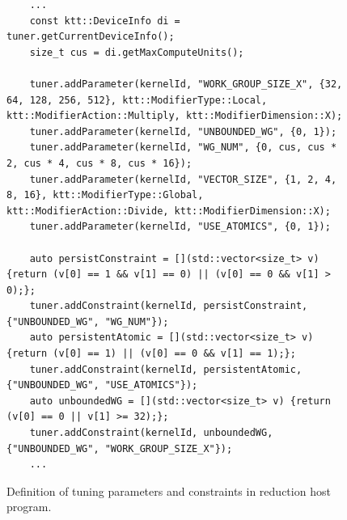 \documentclass
[
    digital, %
    oneside, %
    table, %
    nolof, %
    nolot, %
    nocover %
]{fithesis3}
\begin{document}
\begin{figure}
\footnotesize
\begin{adjustwidth}{-1cm}{-1cm}
\begin{lstlisting}
    ...
    const ktt::DeviceInfo di = tuner.getCurrentDeviceInfo();
    size_t cus = di.getMaxComputeUnits();
    
    tuner.addParameter(kernelId, "WORK_GROUP_SIZE_X", {32, 64, 128, 256, 512}, ktt::ModifierType::Local, ktt::ModifierAction::Multiply, ktt::ModifierDimension::X);
    tuner.addParameter(kernelId, "UNBOUNDED_WG", {0, 1});
    tuner.addParameter(kernelId, "WG_NUM", {0, cus, cus * 2, cus * 4, cus * 8, cus * 16});
    tuner.addParameter(kernelId, "VECTOR_SIZE", {1, 2, 4, 8, 16}, ktt::ModifierType::Global, ktt::ModifierAction::Divide, ktt::ModifierDimension::X);
    tuner.addParameter(kernelId, "USE_ATOMICS", {0, 1});
    
    auto persistConstraint = [](std::vector<size_t> v) {return (v[0] == 1 && v[1] == 0) || (v[0] == 0 && v[1] > 0);};
    tuner.addConstraint(kernelId, persistConstraint, {"UNBOUNDED_WG", "WG_NUM"});
    auto persistentAtomic = [](std::vector<size_t> v) {return (v[0] == 1) || (v[0] == 0 && v[1] == 1);};
    tuner.addConstraint(kernelId, persistentAtomic, {"UNBOUNDED_WG", "USE_ATOMICS"});
    auto unboundedWG = [](std::vector<size_t> v) {return (v[0] == 0 || v[1] >= 32);};
    tuner.addConstraint(kernelId, unboundedWG, {"UNBOUNDED_WG", "WORK_GROUP_SIZE_X"});
    ...
\end{lstlisting}
\caption{Definition of tuning parameters and constraints in reduction host program.}
\label{reduction-example-parameters}
\end{adjustwidth}
\end{figure}
\end{document}
